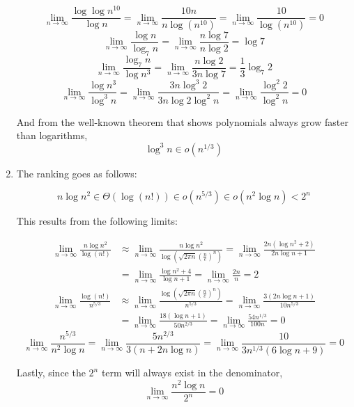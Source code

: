 \documentclass[12pt,twoside]{article}
\begin{document}
\begin{problems}
\begin{problemparts}
\begin{enumerate}
    $$\lim_{n \to \infty} \frac{\log \log n^{10}}{\log n} = \lim_{n \to \infty} 
        \frac{10n}{n \log(n^{10})} = \lim_{n \to \infty} \frac{10}{\log (n^{10})} = 0 $$ 
    $$\lim_{n \to \infty} \frac{\log n}{\log_7 n} = \lim_{n \to \infty} \frac{n 
        \log 7}{n \log 2} = \log 7 $$
    $$\lim_{n \to \infty} \frac{\log_7 n}{\log n^3} = \lim_{n \to \infty} 
        \frac{n \log 2}{3 n \log 7} = \frac{1}{3} \log_7 2 $$
    $$\lim_{n \to \infty} \frac{\log n^3}{\log^3 n} = \lim_{n \to \infty} 
        \frac{3 n \log^3 2}{3 n \log 2 \log^2 n} = \lim_{n \to \infty} \frac{
        \log^2 2}{\log^2 n}= 0 $$ 
        
    And from the well-known theorem that shows polynomials always grow faster
    than logarithms,
    $$ \log^3 n \in o(n^{1/3}) $$
    
    \item The ranking goes as follows:
    
    $$ n \log n^2 \in \Theta(\log(n!)) \in o(n^{5/3}) \in o(n^2 \log n) < 2^n $$
    
    This results from the following limits:
    
    \begin{align*}
        \lim_{n \to \infty} \frac{n \log n^2}{\log(n!)} &\approx \lim_{n \to \infty}
        \frac{n \log n^2}{\log \left(\sqrt{2 \pi n}
        \left(\frac{n}{e}\right)^n\right)} = \lim_{n \to \infty} \frac{ 2n (\log
        n^2 + 2)}{2n \log n + 1} \\
        &= \lim_{n \to \infty} \frac{\log n^2 + 4}
        {\log n + 1} = \lim_{n \to \infty} \frac{2n}{n} = 2
    \end{align*}
    \begin{align*}
        \lim_{n \to \infty} \frac{\log(n!)}{n^{5/3}} &\approx \lim_{n \to \infty} 
        \frac{\log \left(\sqrt{2 \pi n} \left(\frac{n}{e}\right)^n\right)}{n^{5/3}}
        = \lim_{n \to \infty} \frac{3 (2n \log n + 1)}{10n^{5/3}} \\
        &= \lim_{n \to \infty}
        \frac{18(\log n + 1)}{50 n^{2/3}} = \lim_{n \to \infty} \frac{54 n^{1/3}}{100n}= 0 
    \end{align*}
    $$\lim_{n \to \infty} \frac{n^{5/3}}{n^2 \log n} = \lim_{n \to \infty} 
        \frac{5 n^{2/3}}{3(n + 2n \log n)} = \lim_{n \to \infty} \frac{10}{3 n^{1/3} 
        (6 \log n + 9)}= 0 $$
        
    Lastly, since the $2^n$ term will always exist in the denominator,
    $$\lim_{n \to \infty} \frac{n^2 \log n}{2^n} = 0 $$
    

\end{enumerate}
\end{problemparts}
\end{problems}
\end{document}
